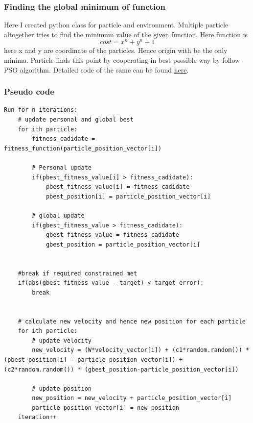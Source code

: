 \subsubsection{Finding the global minimum of function}
Here I created python class for particle and environment. Multiple particle altogether tries to find the minimum value of the given function. Here function is \[ cost = x^n + y^n + 1 \] here x and y are coordinate of the particles. Hence origin with be the only minima. Particle finds this point by cooperating in best possible way by follow PSO algorithm. Detailed code of the same can be found \href{https://github.com/iamrajee/Slam_and_RL_BTP/tree/master/code/swarm/pso}{here}.
\subsubsection{Pseudo code}
\begin{verbatim}
Run for n iterations:
    # update personal and global best
    for ith particle:
        fitness_cadidate = fitness_function(particle_position_vector[i])
        
        # Personal update 
        if(pbest_fitness_value[i] > fitness_cadidate):
            pbest_fitness_value[i] = fitness_cadidate
            pbest_position[i] = particle_position_vector[i]
        
        # global update 
        if(gbest_fitness_value > fitness_cadidate):
            gbest_fitness_value = fitness_cadidate
            gbest_position = particle_position_vector[i]
    
    
    #break if required constrained met
    if(abs(gbest_fitness_value - target) < target_error):
        break
    
    
    # calculate new velocity and hence new position for each particle
    for ith particle:
        # update velocity
        new_velocity = (W*velocity_vector[i]) + (c1*random.random()) * (pbest_position[i] - particle_position_vector[i]) + (c2*random.random()) * (gbest_position-particle_position_vector[i])
        
        # update position
        new_position = new_velocity + particle_position_vector[i]
        particle_position_vector[i] = new_position
    iteration++
\end{verbatim}



